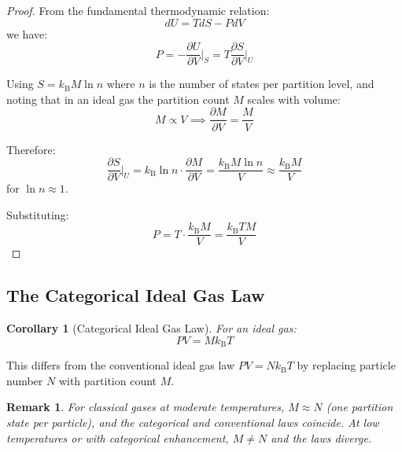 \documentclass[twocolumn,10pt,twoside]{article}
\newtheorem{corollary}[theorem]{Corollary}
\newtheorem{remark}[theorem]{Remark}
\newcommand{\kb}{k_{\mathrm{B}}}
\begin{document}
\begin{proof}
From the fundamental thermodynamic relation:
\begin{equation}
dU = TdS - PdV
\end{equation}
we have:
\begin{equation}
P = -\frac{\partial U}{\partial V}\bigg|_S = T\frac{\partial S}{\partial V}\bigg|_U
\end{equation}

Using $S = \kb M \ln n$ where $n$ is the number of states per partition level, and noting that in an ideal gas the partition count $M$ scales with volume:
\begin{equation}
M \propto V \implies \frac{\partial M}{\partial V} = \frac{M}{V}
\end{equation}

Therefore:
\begin{equation}
\frac{\partial S}{\partial V}\bigg|_U = \kb \ln n \cdot \frac{\partial M}{\partial V} = \frac{\kb M \ln n}{V} \approx \frac{\kb M}{V}
\end{equation}
for $\ln n \approx 1$.

Substituting:
\begin{equation}
P = T \cdot \frac{\kb M}{V} = \frac{\kb T M}{V}
\end{equation}
\end{proof}

\subsection{The Categorical Ideal Gas Law}

\begin{corollary}[Categorical Ideal Gas Law]
\label{cor:ideal_gas}
For an ideal gas:
\begin{equation}
PV = M \kb T
\label{eq:categorical_ideal_gas}
\end{equation}
\end{corollary}

This differs from the conventional ideal gas law $PV = N\kb T$ by replacing particle number $N$ with partition count $M$.

\begin{remark}
For classical gases at moderate temperatures, $M \approx N$ (one partition state per particle), and the categorical and conventional laws coincide. At low temperatures or with categorical enhancement, $M \neq N$ and the laws diverge.
\end{remark}
\end{document}
